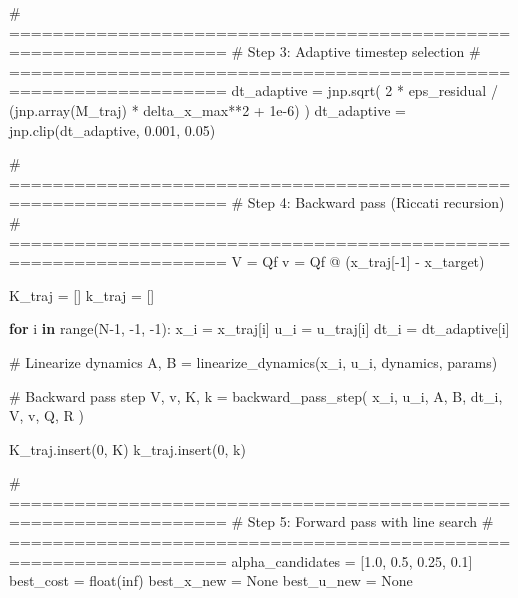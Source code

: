 \documentclass[
  letterpaper,
  DIV=11,
  numbers=noendperiod]{scrartcl}
\newenvironment{Shaded}{\begin{snugshade}}{\end{snugshade}}
\newcommand{\BuiltInTok}[1]{\textcolor[rgb]{0.00,0.23,0.31}{#1}}
\newcommand{\CommentTok}[1]{\textcolor[rgb]{0.37,0.37,0.37}{#1}}
\newcommand{\ControlFlowTok}[1]{\textcolor[rgb]{0.00,0.23,0.31}{\textbf{#1}}}
\newcommand{\DecValTok}[1]{\textcolor[rgb]{0.68,0.00,0.00}{#1}}
\newcommand{\FloatTok}[1]{\textcolor[rgb]{0.68,0.00,0.00}{#1}}
\newcommand{\KeywordTok}[1]{\textcolor[rgb]{0.00,0.23,0.31}{\textbf{#1}}}
\newcommand{\NormalTok}[1]{\textcolor[rgb]{0.00,0.23,0.31}{#1}}
\newcommand{\OperatorTok}[1]{\textcolor[rgb]{0.37,0.37,0.37}{#1}}
\newcommand{\StringTok}[1]{\textcolor[rgb]{0.13,0.47,0.30}{#1}}
\newcommand{\VariableTok}[1]{\textcolor[rgb]{0.07,0.07,0.07}{#1}}
\begin{document}
\begin{Shaded}
\begin{Highlighting}[]
        \CommentTok{\# ==================================================================}
        \CommentTok{\# Step 3: Adaptive timestep selection}
        \CommentTok{\# ==================================================================}
\NormalTok{        dt\_adaptive }\OperatorTok{=}\NormalTok{ jnp.sqrt(}
            \DecValTok{2} \OperatorTok{*}\NormalTok{ eps\_residual }\OperatorTok{/}\NormalTok{ (jnp.array(M\_traj) }\OperatorTok{*}\NormalTok{ delta\_x\_max}\OperatorTok{**}\DecValTok{2} \OperatorTok{+} \FloatTok{1e{-}6}\NormalTok{)}
\NormalTok{        )}
\NormalTok{        dt\_adaptive }\OperatorTok{=}\NormalTok{ jnp.clip(dt\_adaptive, }\FloatTok{0.001}\NormalTok{, }\FloatTok{0.05}\NormalTok{)}

        \CommentTok{\# ==================================================================}
        \CommentTok{\# Step 4: Backward pass (Riccati recursion)}
        \CommentTok{\# ==================================================================}
\NormalTok{        V }\OperatorTok{=}\NormalTok{ Qf}
\NormalTok{        v }\OperatorTok{=}\NormalTok{ Qf }\OperatorTok{@}\NormalTok{ (x\_traj[}\OperatorTok{{-}}\DecValTok{1}\NormalTok{] }\OperatorTok{{-}}\NormalTok{ x\_target)}

\NormalTok{        K\_traj }\OperatorTok{=}\NormalTok{ []}
\NormalTok{        k\_traj }\OperatorTok{=}\NormalTok{ []}

        \ControlFlowTok{for}\NormalTok{ i }\KeywordTok{in} \BuiltInTok{range}\NormalTok{(N}\OperatorTok{{-}}\DecValTok{1}\NormalTok{, }\OperatorTok{{-}}\DecValTok{1}\NormalTok{, }\OperatorTok{{-}}\DecValTok{1}\NormalTok{):}
\NormalTok{            x\_i }\OperatorTok{=}\NormalTok{ x\_traj[i]}
\NormalTok{            u\_i }\OperatorTok{=}\NormalTok{ u\_traj[i]}
\NormalTok{            dt\_i }\OperatorTok{=}\NormalTok{ dt\_adaptive[i]}

            \CommentTok{\# Linearize dynamics}
\NormalTok{            A, B }\OperatorTok{=}\NormalTok{ linearize\_dynamics(x\_i, u\_i, dynamics, params)}

            \CommentTok{\# Backward pass step}
\NormalTok{            V, v, K, k }\OperatorTok{=}\NormalTok{ backward\_pass\_step(}
\NormalTok{                x\_i, u\_i, A, B, dt\_i, V, v, Q, R}
\NormalTok{            )}

\NormalTok{            K\_traj.insert(}\DecValTok{0}\NormalTok{, K)}
\NormalTok{            k\_traj.insert(}\DecValTok{0}\NormalTok{, k)}

        \CommentTok{\# ==================================================================}
        \CommentTok{\# Step 5: Forward pass with line search}
        \CommentTok{\# ==================================================================}
\NormalTok{        alpha\_candidates }\OperatorTok{=}\NormalTok{ [}\FloatTok{1.0}\NormalTok{, }\FloatTok{0.5}\NormalTok{, }\FloatTok{0.25}\NormalTok{, }\FloatTok{0.1}\NormalTok{]}
\NormalTok{        best\_cost }\OperatorTok{=} \BuiltInTok{float}\NormalTok{(}\StringTok{\textquotesingle{}inf\textquotesingle{}}\NormalTok{)}
\NormalTok{        best\_x\_new }\OperatorTok{=} \VariableTok{None}
\NormalTok{        best\_u\_new }\OperatorTok{=} \VariableTok{None}


\end{Highlighting}
\end{Shaded}
\end{document}
